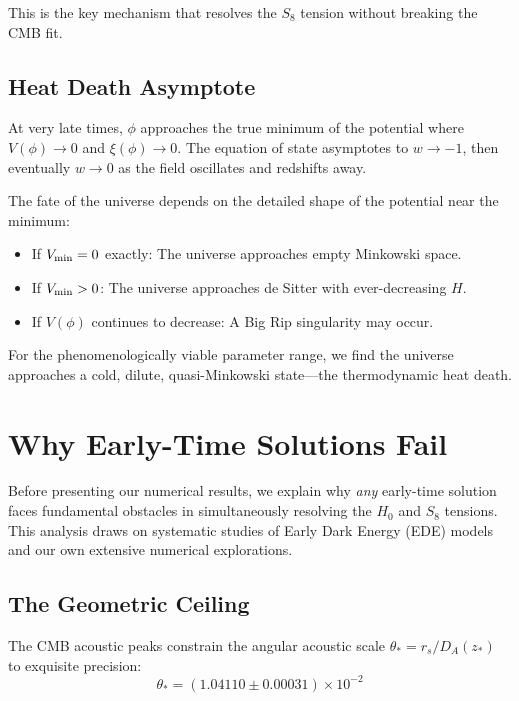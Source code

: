 \documentclass[twocolumn,showpacs,preprintnumbers,amsmath,amssymb,prd]{revtex4-2}
\begin{document}
This is the key mechanism that resolves the $S_8$ tension without breaking the CMB fit.

\subsection{Heat Death Asymptote}

At very late times, $\phi$ approaches the true minimum of the potential where $V(\phi) \to 0$ and $\xi(\phi) \to 0$. The equation of state asymptotes to $w \to -1$, then eventually $w \to 0$ as the field oscillates and redshifts away.

The fate of the universe depends on the detailed shape of the potential near the minimum:
\begin{itemize}
    \item If $V_{\rm min} = 0$ exactly: The universe approaches empty Minkowski space.
    \item If $V_{\rm min} > 0$: The universe approaches de Sitter with ever-decreasing $H$.
    \item If $V(\phi)$ continues to decrease: A Big Rip singularity may occur.
\end{itemize}

For the phenomenologically viable parameter range, we find the universe approaches a cold, dilute, quasi-Minkowski state---the thermodynamic heat death.

\section{Why Early-Time Solutions Fail}
\label{sec:why_ede_fails}

Before presenting our numerical results, we explain why \textit{any} early-time solution faces fundamental obstacles in simultaneously resolving the $H_0$ and $S_8$ tensions. This analysis draws on systematic studies of Early Dark Energy (EDE) models \cite{Poulin2019,Smith2020,Hill2020} and our own extensive numerical explorations.

\subsection{The Geometric Ceiling}

The CMB acoustic peaks constrain the angular acoustic scale $\theta_* = r_s / D_A(z_*)$ to exquisite precision:
\begin{equation}
\theta_* = (1.04110 \pm 0.00031) \times 10^{-2}
\end{equation}
\end{document}
